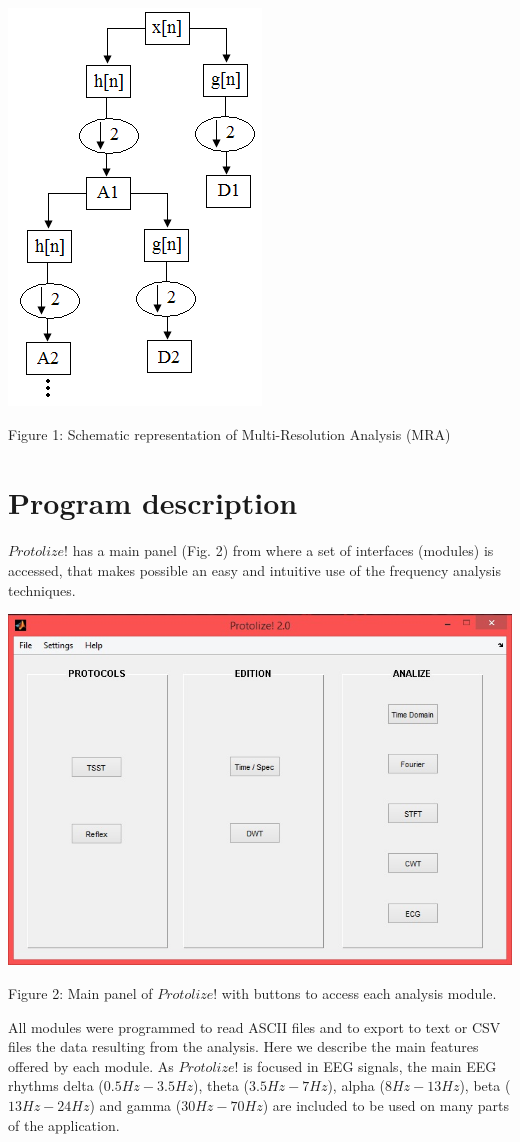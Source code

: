 \documentclass[12pt, a4paper]{article}
\begin{document}
\begin{center}
\includegraphics{image001.png}

Figure 1: Schematic representation of Multi-Resolution Analysis (MRA)
\end{center}


\section{Program description}

$Protolize!$ has a main panel (Fig. 2) from where a set of interfaces (modules) is accessed, that makes possible an easy and intuitive use of the frequency analysis techniques.
\begin{center}
\includegraphics[width=15cm]{image002.jpg}

Figure 2: Main panel of $Protolize!$ with buttons to access each analysis module.
\end{center}
All modules were programmed to read ASCII files and to export to text or CSV files the data resulting from the analysis. Here we describe the main features offered by each module. As $Protolize!$ is focused in EEG signals, the main EEG rhythms delta ($0.5Hz-3.5Hz$), theta ($3.5Hz-7Hz$), alpha ($8Hz-13Hz$), beta ($13Hz-24Hz$) and gamma ($30Hz-70Hz$) are included to be used on many parts of the application.
\end{document}
